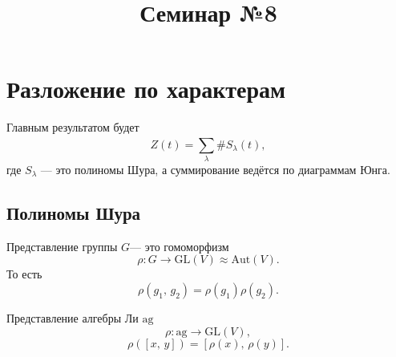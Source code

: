 \documentclass[a4paper]{article}
\title{Семинар №8}
\begin{document}
	\maketitle
\section*{Разложение по характерам}
Главным результатом будет
\[
	Z(t)= \sum_{\lambda}^{} \# S_\lambda (t)
,\] 
где $S_\lambda$ --- это полиномы Шура, а суммирование ведётся
по диаграммам Юнга.
\subsection*{Полиномы Шура}
Представление группы $G$--- это гомоморфизм
\[
	\rho\colon  G \to  \mathrm{GL}(V) \approx
	\mathrm{Aut}(V)
.\] 
То есть
\[
	\rho(g_1,\,g_2)=\rho(g_1) \rho(g_2)
.\] 

Представление алгебры Ли $\mathrm{ag}$
 \[
	 \rho\colon  \mathrm{ag} \to  \mathrm{GL}(V)
,\]
\[
	\rho\left( \left[ x,\,y \right]  \right) =
	\left[ \rho(x),\,\rho(y) \right] 
.\] 
\end{document}
